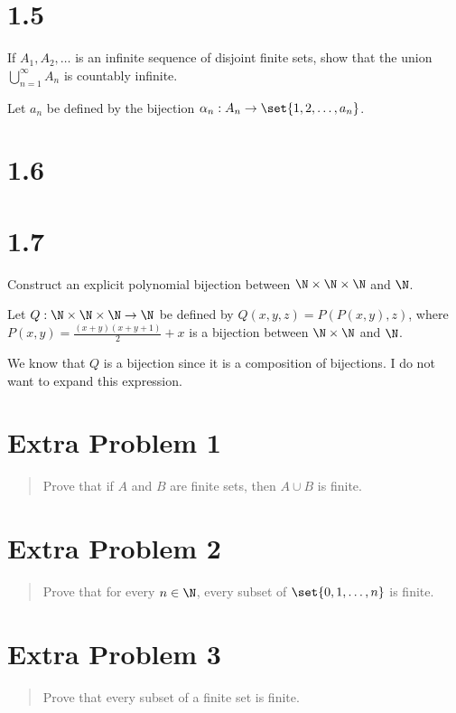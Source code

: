 \documentclass[10pt]{mypackage}
\begin{document}
\section{1.5}%
\begin{problem}
  If $A_1,A_2,\dots$ is an infinite sequence of disjoint finite sets, show that the union $\bigcup_{n=1}^{\infty}A_n$ is countably infinite.
\end{problem}
\begin{solution}
  Let $a_n$ be defined by the bijection $\alpha_n: A_n \rightarrow \set{1,2,\dots,a_n}$.
\end{solution}
\section{1.6}%
\section{1.7}%
\begin{problem}
  Construct an explicit polynomial bijection between $\N\times\N\times\N$ and $\N$.
\end{problem}
\begin{solution}
  Let $Q: \N\times\N\times\N \rightarrow \N$ be defined by $Q(x,y,z) = P\left(P(x,y),z\right)$, where $P(x,y) = \frac{(x+y)(x+y+1)}{2} + x$ is a bijection between $\N\times\N$ and $\N$.\newline

  We know that $Q$ is a bijection since it is a composition of bijections. I do not want to expand this expression.
\end{solution}
\section{Extra Problem 1}%
\begin{quote}
  Prove that if $A$ and $B$ are finite sets, then $A\cup B$ is finite.
\end{quote}
\section{Extra Problem 2}%
\begin{quote}
  Prove that for every $n\in \N$, every subset of $\set{0,1,\dots,n}$ is finite.
\end{quote}

\section{Extra Problem 3}%
\begin{quote}
  Prove that every subset of a finite set is finite.
\end{quote}
\end{document}
